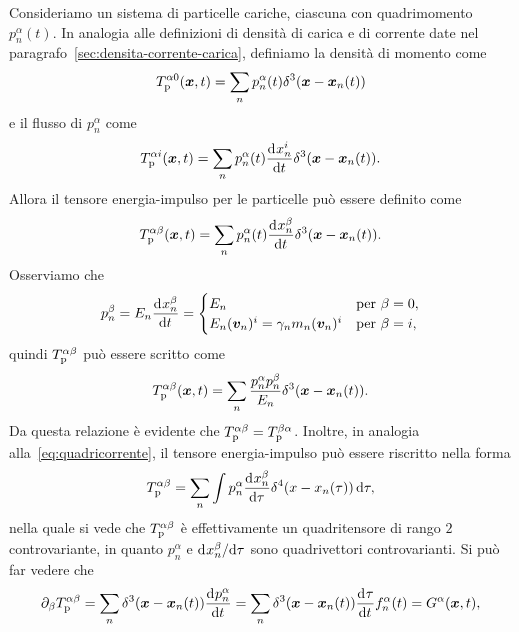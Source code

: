 Consideriamo un sistema di particelle cariche, ciascuna con quadrimomento
$p_{n}^{\alpha}(t)$.  In analogia alle definizioni di densità di carica e di
corrente date nel paragrafo~\ref{sec:densita-corrente-carica}, definiamo la
densità di momento come
\begin{equation}
  T_{\textup{p}}^{\alpha0}(\bm{x}, t) = \sum_{n} p_{n}^{\alpha}(t)
  \delta^{3}(\bm{x} - \bm{x}_{n}(t))
\end{equation}
e il flusso di $p_{n}^{\alpha}$ come
\begin{equation}
  T_{\textup{p}}^{\alpha i}(\bm{x}, t) = \sum_{n} p_{n}^{\alpha}(t)
  \frac{{\mathop{}\!\mathrm{d}^{}}x_{n}^{i}}{\mathop{}\!\mathrm{d} {t}^{}} \delta^{3}(\bm{x} - \bm{x}_{n}(t)).
\end{equation}
Allora il tensore energia-impulso per le particelle può essere definito come
\begin{equation}
  T_{\textup{p}}^{\alpha\beta}(\bm{x}, t) = \sum_{n} p_{n}^{\alpha}(t)
  \frac{{\mathop{}\!\mathrm{d}^{}}x_{n}^{\beta}}{\mathop{}\!\mathrm{d} {t}^{}} \delta^{3}(\bm{x} - \bm{x}_{n}(t)).
\end{equation}
Osserviamo che
\begin{equation}
  p_{n}^{\beta} = E_{n} \frac{{\mathop{}\!\mathrm{d}^{}}x_{n}^{\beta}}{\mathop{}\!\mathrm{d} {t}^{}} =
  \begin{cases}
    E_{n} & \text{per $\beta = 0$}, \\
    E_{n}(\bm{v}_{n})^{i} = \gamma_{n}m_{n}(\bm{v}_{n})^{i} & \text{per $\beta =
      i$},
  \end{cases}
\end{equation}
quindi $T_{\textup{p}}^{\alpha\beta}$ può essere scritto come
\begin{equation}
  T_{\textup{p}}^{\alpha\beta}(\bm{x}, t) = \sum_{n} \frac{p_{n}^{\alpha}
    p_{n}^{\beta}}{E_{n}} \delta^{3}(\bm{x} - \bm{x}_{n}(t)).
\end{equation}
Da questa relazione è evidente che
$T_{\textup{p}}^{\alpha\beta} = T_{\textup{p}}^{\beta\alpha}$.  Inoltre, in
analogia alla~\eqref{eq:quadricorrente}, il tensore energia-impulso può essere
riscritto nella forma
\begin{equation}
  T_{\textup{p}}^{\alpha\beta} = \sum_{n} \int p_{n}^{\alpha}
  \frac{{\mathop{}\!\mathrm{d}^{}}x_{n}^{\beta}}{\mathop{}\!\mathrm{d} {\tau}^{}} \delta^{4}(x - x_{n}(\tau))\mathop{}\!\mathrm{d} \tau,
\end{equation}
nella quale si vede che $T_{\textup{p}}^{\alpha\beta}$ è effettivamente un
quadritensore di rango $2$ controvariante, in quanto $p_{n}^{\alpha}$ e
$\mathrm{d}^{}x_{n}^{\beta} / \mathrm{d} {\tau}^{}$ sono quadrivettori controvarianti.  Si può far
vedere che
\begin{equation}
  \partial_{\beta}T_{\textup{p}}^{\alpha\beta} = \sum_{n}
  \delta^{3}(\bm{x} - \bm{x}_{n}(t)) \frac{{\mathop{}\!\mathrm{d}^{}}p_{n}^{\alpha}}{\mathop{}\!\mathrm{d} {t}^{}} = \sum_{n}
  \delta^{3}(\bm{x} - \bm{x}_{n}(t)) \frac{{\mathop{}\!\mathrm{d}^{}}\tau}{\mathop{}\!\mathrm{d} {t}^{}}f_{n}^{\alpha}(t) =
  G^{\alpha}(\bm{x}, t),
\end{equation}
